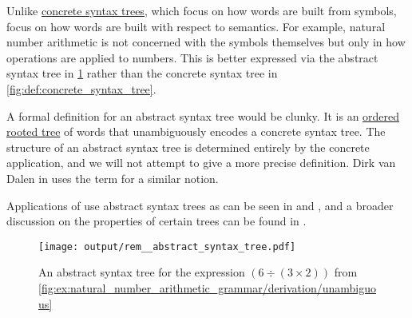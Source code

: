 \begin{remark}\label{rem:abstract_syntax_tree}
  Unlike \hyperref[def:concrete_syntax_tree]{concrete syntax trees}, which focus on how words are built from symbols,  focus on how words are built with respect to semantics. For example, natural number arithmetic is not concerned with the symbols themselves but only in how operations are applied to numbers. This is better expressed via the abstract syntax tree in \cref{fig:rem:abstract_syntax_tree} rather than the concrete syntax tree in \cref{fig:def:concrete_syntax_tree}.

  A formal definition for an abstract syntax tree would be clunky. It is an \hyperref[def:ordered_arborescence]{ordered} \hyperref[def:arborescence/undirected]{rooted tree} of words that unambiguously encodes a concrete syntax tree. The structure of an abstract syntax tree is determined entirely by the concrete application, and we will not attempt to give a more precise definition. Dirk van Dalen in \cite{VanDalen2004} uses the term  for a similar notion.

  Applications of  use abstract syntax trees as can be seen in  and , and a broader discussion on the properties of certain trees can be found in .

  \begin{figure}[!ht]
    \hfill
    \texttt{[image: output/rem\_\_abstract\_syntax\_tree.pdf]}
    \hfill\hfill
    \caption{An abstract syntax tree for the expression \( (6 \div (3 \times 2)) \) from \cref{fig:ex:natural_number_arithmetic_grammar/derivation/unambiguous}}
    \label{fig:rem:abstract_syntax_tree}
  \end{figure}
\end{remark}

